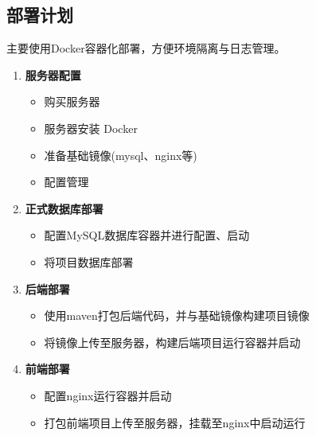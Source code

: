 \subsection{部署计划}
主要使用Docker容器化部署，方便环境隔离与日志管理。
\begin{enumerate}
    \item \textbf{服务器配置}
          \begin{itemize}
              \item 购买服务器
              \item 服务器安装 Docker
              \item 准备基础镜像(mysql、nginx等)
              \item 配置管理
          \end{itemize}

    \item \textbf{正式数据库部署}
          \begin{itemize}
              \item 配置MySQL数据库容器并进行配置、启动
              \item 将项目数据库部署
          \end{itemize}

    \item \textbf{后端部署}
          \begin{itemize}
              \item 使用maven打包后端代码，并与基础镜像构建项目镜像
              \item 将镜像上传至服务器，构建后端项目运行容器并启动
          \end{itemize}

    \item \textbf{前端部署}
          \begin{itemize}
              \item 配置nginx运行容器并启动
              \item 打包前端项目上传至服务器，挂载至nginx中启动运行
          \end{itemize}

\end{enumerate}


